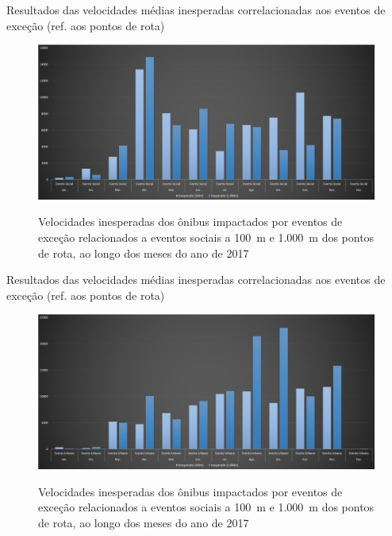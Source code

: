 \documentclass{beamer}
\begin{document}
\begin{frame}{Resultados das velocidades médias inesperadas correlacionadas aos eventos de exceção (ref. aos pontos de rota)}
\begin{figure}[!htb]
	\centering
 	  \caption{Velocidades inesperadas dos ônibus impactados por eventos de exceção relacionados a eventos sociais a 100~m e 1.000~m dos pontos de rota, ao longo dos meses do ano de 2017}
		\includegraphics[width=0.8\linewidth]{apriori_analysis_shapes_social_events.png}
	\label{fig:apriori_analysis_shapes_social_events}
\end{figure}
\end{frame}
\begin{frame}{Resultados das velocidades médias inesperadas correlacionadas aos eventos de exceção (ref. aos pontos de rota)}
    \begin{figure}[!htb]
	\centering
 	  \caption{Velocidades inesperadas dos ônibus impactados por eventos de exceção relacionados a eventos sociais a 100~m e 1.000~m dos pontos de rota, ao longo dos meses do ano de 2017}
		\includegraphics[width=0.8\linewidth]{apriori_analysis_shapes_urban_events.png}
	\label{fig:apriori_analysis_shapes_urban_events}
\end{figure}
\end{frame}
\end{document}
